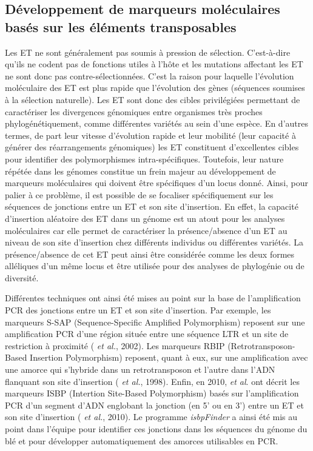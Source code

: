 \documentclass[a4paper, 12pt]{article}
\begin{document}
\begin{onehalfspace}
\newpage
\thispagestyle{empty}
\null
\addtocounter{page}{-1}
\newpage

\subsection{Développement de marqueurs moléculaires basés sur les éléments transposables}
Les ET ne sont généralement pas soumis à pression de sélection. C'est-à-dire qu'ils ne codent pas de fonctions utiles à l'hôte et les mutations affectant les ET ne sont donc pas contre-sélectionnées. C'est la raison pour laquelle l'évolution moléculaire des ET est plus rapide que l'évolution des gènes (séquences soumises à la sélection naturelle). Les ET sont donc des cibles privilégiées permettant de caractériser les divergences génomiques entre organismes très proches phylogénétiquement, comme différentes variétés au sein d'une espèce. En d'autres termes, de part leur vitesse d'évolution rapide et leur mobilité (leur capacité à générer des réarrangements génomiques) les ET constituent d'excellentes cibles pour identifier des polymorphismes intra-spécifiques. Toutefois, leur nature répétée dans les génomes constitue un frein majeur au développement de marqueurs moléculaires qui doivent être spécifiques d'un locus donné. Ainsi, pour palier à ce problème, il est possible de se focaliser spécifiquement sur les séquences de jonctions entre un ET et son site d'insertion. En effet, la capacité d'insertion aléatoire des ET dans un génome est un atout pour les analyses moléculaires car elle permet de caractériser la présence/absence d'un ET au niveau de son site d'insertion chez différents individus ou différentes variétés. La présence/absence de cet ET peut ainsi être considérée comme les deux formes alléliques d'un même locus et être utilisée pour des analyses de phylogénie ou de diversité.

Différentes techniques ont ainsi été mises au point sur la base de l'amplification PCR des jonctions entre un ET et son site d'insertion. Par exemple, les marqueurs S-SAP (Sequence-Specific Amplified Polymorphism) reposent sur une amplification PCR d'une région située entre une séquence LTR et un site de restriction à proximité ( \textit{et al.}, 2002). Les marqueurs RBIP (Retrotransposon-Based Insertion Polymorphism) reposent, quant à eux, sur une amplification avec une amorce qui s'hybride dans un retrotransposon et l'autre dans l'ADN flanquant son site d'insertion ( \textit{et al.}, 1998). Enfin, en 2010,  \textit{et al}. ont décrit les marqueurs ISBP (Intertion Site-Based Polymorphism) basés sur l'amplification PCR d'un segment d'ADN englobant la jonction (en 5' ou en 3') entre un ET et son site d'insertion ( \textit{et al.}, 2010). Le programme \textit{isbpFinder} a ainsi été mis au point dans l'équipe pour identifier ces jonctions dans les séquences du génome du blé et pour développer automatiquement des amorces utilisables en PCR.


\end{onehalfspace}
\end{document}

